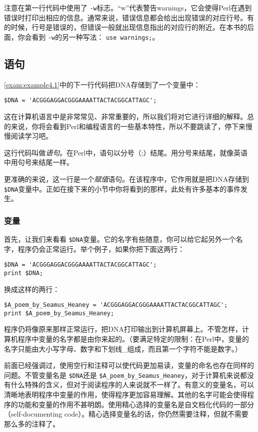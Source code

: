 注意在第一行代码中使用了 \verb|-w|标志。“w”代表警告warnings，它会使得Perl在遇到错误时打印出相应的信息。通常来说，错误信息都会给出出现错误的对应行号。有的时候，行号是错误的，但错误一般就出现信息指出的对应行的附近。在本书的后面，你会看到 \verb|-w|的另一种写法： \verb|use warnings;|。

\subsection{语句}
\autoref{exam:example4.1}中的下一行代码把DNA存储到了一个变量中：

\begin{lstlisting}
$DNA = 'ACGGGAGGACGGGAAAATTACTACGGCATTAGC';
\end{lstlisting}

这在计算机语言中是非常常见、非常重要的，所以我们将对它进行详细的解释。总的来说，你将会看到Perl和编程语言的一些基本特性，所以不要跳读了，停下来慢慢阅读学习吧。

这行代码叫做\textit{语句}。在Perl中，语句以分号（;）结尾。用分号来结尾，就像英语中用句号来结尾一样。

更准确的来说，这一行是一个\textit{赋值}语句。在该程序中，它作用就是把DNA存储到 \verb|$DNA|变量中。正如在接下来的小节中你将看到的那样，此处有许多基本的事件发生。

\subsubsection{变量}
首先，让我们来看看 \verb|$DNA|变量。它的名字有些随意，你可以给它起另外一个名字，程序仍会正常运行。举个例子，如果你把下面这两行：

\begin{lstlisting}
$DNA = 'ACGGGAGGACGGGAAAATTACTACGGCATTAGC';
print $DNA;
\end{lstlisting}
换成这样的两行：

\begin{lstlisting}
$A_poem_by_Seamus_Heaney = 'ACGGGAGGACGGGAAAATTACTACGGCATTAGC';
print $A_poem_by_Seamus_Heaney;
\end{lstlisting}
程序仍将像原来那样正常运行，把DNA打印输出到计算机屏幕上。不管怎样，计算机程序中变量的名字都是由你来起的。（要满足特定的限制：在Perl中，变量的名字只能由大小写字母、数字和下划线\_组成，而且第一个字符不能是数字。）

前面已经强调过，使用空行和注释可以使代码更加易读，变量的命名也存在同样的问题。不管变量名是 \verb|$DNA|还是 \verb|$A_poem_by_Seamus_Heaney|，对于计算机来说都没有什么特殊的含义，但对于阅读程序的人来说就不一样了。有意义的变量名，可以清晰地表明程序中变量的作用，使得程序更加容易理解。其他的名字可能会使得程序的功能和变量的作用不甚明朗。使用精心选择的变量名是自文档化代码的一部分（self-documenting code）。精心选择变量名的话，你仍然需要注释，但就不需要那么多的注释了。

